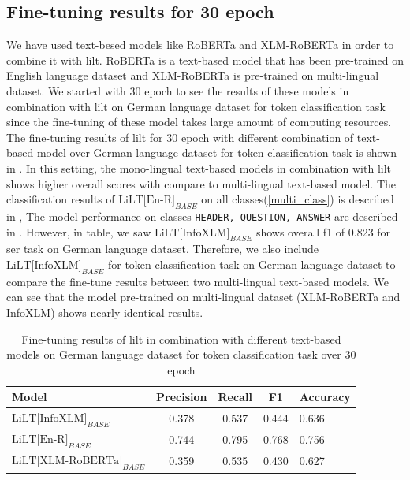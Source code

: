 \subsection{Fine-tuning results for 30 epoch}
We have used text-besed models like RoBERTa and XLM-RoBERTa in order to combine it with \acrshort{lilt}. RoBERTa is a text-based model that has been pre-trained on English language dataset and XLM-RoBERTa is pre-trained on multi-lingual dataset. We started with 30 epoch to see the results of these models in combination with \acrshort{lilt} on German language dataset for token classification task since the fine-tuning of these model takes large amount of computing resources. The fine-tuning results of \acrshort{lilt} for 30 epoch with different combination of text-based model over German language dataset for token classification task is shown in . In this setting, the mono-lingual text-based models in combination with \acrshort{lilt} shows higher overall scores with compare to multi-lingual text-based model. The classification results of \(\text{LiLT[En-R]}_{BASE}\) on all classes(\ref{multi_class}) is described in , The model performance on classes \verb|HEADER, QUESTION, ANSWER|  are described in . However, in table, we saw \(\text{LiLT[InfoXLM]}_{BASE}\) shows overall f1 of 0.823 for \acrshort{ser} task on German language dataset. Therefore, we also include  \(\text{LiLT[InfoXLM]}_{BASE}\) for token classification task on German language dataset to compare the fine-tune results between two multi-lingual text-based models. We can see that the model pre-trained on multi-lingual dataset (XLM-RoBERTa and InfoXLM) shows nearly identical results. 

\begin{table}[!ht]
    \centering
    \captionsetup{justification=centering}
    \begin{tabular}{lcccl}
        \toprule
        \textbf{Model}& \textbf{Precision}& \textbf{Recall}& \textbf{F1} & \textbf{Accuracy}\\ \midrule
        \(\text{LiLT[InfoXLM]}_{BASE}\)& 0.378& 0.537& 0.444& 0.636 \\ \midrule
         \(\text{LiLT[En-R]}_{BASE}\) &  0.744& 0.795& 0.768& 0.756 \\
         \(\text{LiLT[XLM-RoBERTa]}_{BASE}\)& 0.359& 0.535& 0.430& 0.627 \\ \bottomrule
    \end{tabular}
    \caption{Fine-tuning results of \acrshort{lilt} in combination with different text-based models on German language dataset for token classification task over 30 epoch}
    \label{tab:30_epoch_results}
\end{table}

